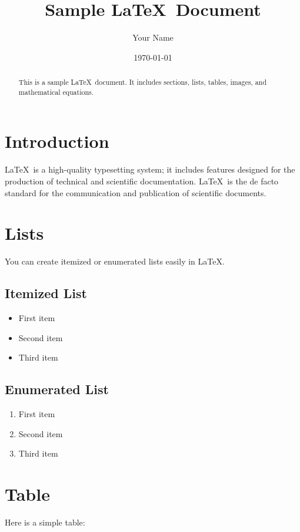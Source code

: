 \documentclass{article}
\title{Sample \LaTeX\ Document}
\author{Your Name}
\date{\today}
\begin{document}
\maketitle

\begin{abstract}
This is a sample \LaTeX\ document. It includes sections, lists, tables, images, and mathematical equations.
\end{abstract}

\section{Introduction}
\LaTeX\ is a high-quality typesetting system; it includes features designed for the production of technical and scientific documentation. \LaTeX\ is the de facto standard for the communication and publication of scientific documents.

\section{Lists}
You can create itemized or enumerated lists easily in \LaTeX.

\subsection{Itemized List}
\begin{itemize}
    \item First item
    \item Second item
    \item Third item
\end{itemize}

\subsection{Enumerated List}
\begin{enumerate}
    \item First item
    \item Second item
    \item Third item
\end{enumerate}

\section{Table}
Here is a simple table:
\end{document}
